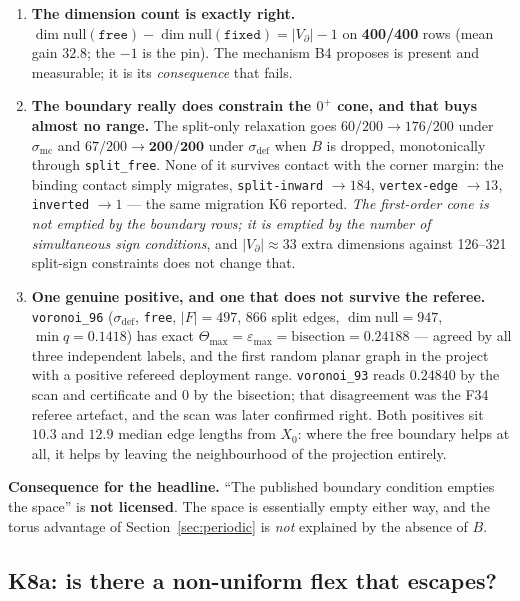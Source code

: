 \documentclass[11pt,a4paper]{article}
\theoremstyle{definition}
\newcommand{\Tmax}{\Theta_{\max}}
\newcommand{\file}[1]{\texttt{\small #1}}
\begin{document}
\begin{enumerate}\itemsep3pt
\item \textbf{The dimension count is exactly right.}
$\dim\mathrm{null}(\texttt{free})-\dim\mathrm{null}(\texttt{fixed}) = |V_\partial|-1$ on
\textbf{400/400} rows (mean gain $32.8$; the $-1$ is the pin). The mechanism B4 proposes is
present and measurable; it is its \emph{consequence} that fails.
\item \textbf{The boundary really does constrain the $0^+$ cone, and that buys almost no
range.} The split-only relaxation goes $60/200\to176/200$ under $\sigma_{\mathrm{mc}}$ and
$67/200\to\mathbf{200/200}$ under $\sigma_{\mathrm{def}}$ when $B$ is dropped, monotonically
through \texttt{split\_free}. None of it survives contact with the corner margin: the binding
contact simply migrates, \texttt{split-inward} $\to184$, \texttt{vertex-edge} $\to13$,
\texttt{inverted} $\to1$ --- the same migration K6 reported. \emph{The first-order cone is not
emptied by the boundary rows; it is emptied by the number of simultaneous sign conditions},
and $|V_\partial|\approx33$ extra dimensions against 126--321 split-sign constraints does not
change that.
\item \textbf{One genuine positive, and one that does not survive the referee.}
\file{voronoi\_96} ($\sigma_{\mathrm{def}}$, \texttt{free}, $|F|=497$, 866 split edges,
$\dim\mathrm{null}=947$, $\min q = 0.1418$) has exact $\Tmax = \varepsilon_{\max} =
\text{bisection} = 0.24188$ --- agreed by all three independent labels, and the first random
planar graph in the project with a positive refereed deployment range. \file{voronoi\_93}
reads $0.24840$ by the scan and certificate and $0$ by the bisection; that disagreement was
the F34 referee artefact, and the scan was later confirmed right. Both positives sit
$10.3$ and $12.9$ median edge lengths from $X_0$: where the free boundary helps at all, it
helps by leaving the neighbourhood of the projection entirely.
\end{enumerate}

\noindent \textbf{Consequence for the headline.} ``The published boundary condition empties
the space'' is \textbf{not licensed}. The space is essentially empty either way, and the
torus advantage of Section~\ref{sec:periodic} is \emph{not} explained by the absence of $B$.

\subsection{K8a: is there a non-uniform flex that escapes?}
\end{document}
